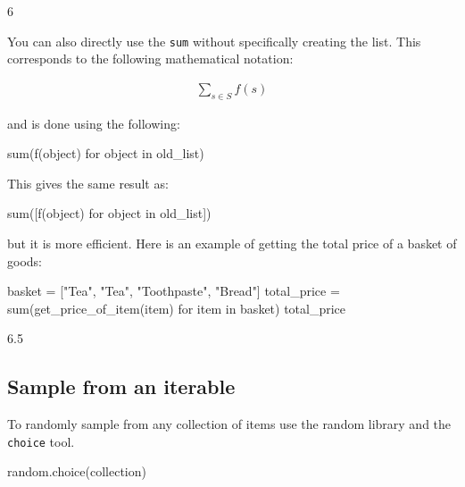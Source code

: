 \begin{raw}
6
\end{raw}





You can also directly use the \texttt{sum} without specifically creating the list. This
corresponds to the following mathematical notation:

\begin{equation*}
\begin{split}
    \sum_{s\in S}f(s)
\end{split}
\end{equation*}

and is done using the following:

\begin{pyin}
sum(f(object) for object in old_list)
\end{pyin}


This gives the same result as:

\begin{pyin}
sum([f(object) for object in old_list])
\end{pyin}


but it is more efficient.
Here is an example of getting the total price of a basket of goods:




\begin{pyin}
basket = ["Tea", "Tea", "Toothpaste", "Bread"]
total_price = sum(get_price_of_item(item) for item in basket)
total_price
\end{pyin}





\begin{raw}
6.5
\end{raw}





\subsection{Sample from an iterable}
\label{\detokenize{tools-for-mathematics/06-probability/how/main:sample-from-an-iterable}}

To randomly sample from any collection of items
use the random library and the \texttt{choice} tool.


\begin{pyin}
random.choice(collection)
\end{pyin}






